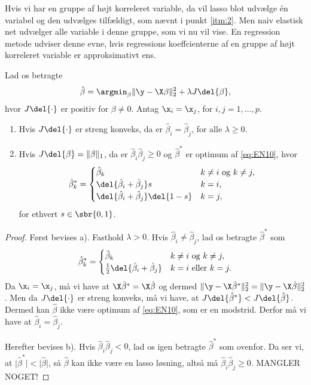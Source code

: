 %
Hvis vi har en gruppe af højt korreleret variable, da vil lasso blot udvælge én variabel og den udvælges tilfældigt, som nævnt i punkt \ref{itm:2}.
Men naiv elastisk net udvælger alle variable i denne gruppe, som vi nu vil vise. 
En regression metode udviser denne evne, hvis regressions koeffcienterne af en gruppe af højt korreleret variable er approksimativt ens.
%
\begin{lem} \label{lem:elastisk_net2}
Lad os betragte
\begin{align}
\hat{\beta} = \argmin_\beta \Vert \y - \X \beta \Vert_2^2 + \lambda J \del{\beta}, \label{eq:EN10}
\end{align}
hvor \(J \del{\cdot}\) er positiv for \(\beta \neq 0\).
Antag \(\x_i = \x_j\), for \(i, j = 1, \ldots, p\).
\begin{enumerate}[label=\alph*)]
\item Hvis \(J \del{\cdot}\) er streng konveks, da er \(\hat{\beta}_i = \hat{\beta}_j\), for alle \(\lambda \geq 0\).
\item Hvis \(J \del{\beta} = \Vert \beta \Vert_1\), da er \(\hat{\beta}_i \hat{\beta}_j \geq 0\) og \(\hat{\beta}^*\) er optimum af \eqref{eq:EN10}, hvor
\begin{align*}
\hat{\beta}_k^* = \begin{cases}
\hat{\beta}_k & k \neq i \text{ og } k \neq j, \\
\del{\hat{\beta}_i + \hat{\beta}_j} s & k = i, \\
\del{\hat{\beta}_i + \hat{\beta}_j} \del{1-s} & k = j,
\end{cases}
\end{align*}
for ethvert \(s \in \sbr{0,1}\).
\end{enumerate}
\end{lem}
%
\begin{proof}
Først bevises a).
Fasthold \(\lambda > 0\).
Hvis \(\hat{\beta}_i \neq \hat{\beta}_j\), lad os betragte \(\hat{\beta}^*\) som
\begin{align*}
\hat{\beta}_k^* = \begin{cases}
\hat{\beta}_k & k \neq i \text{ og } k \neq j, \\
\frac{1}{2} \del{\hat{\beta}_i + \hat{\beta}_j} & k = i \text{ eller } k = j.
\end{cases}
\end{align*}
Da \(\x_i = \x_j\), må vi have at \(\X \hat{\beta}^* = \X \hat{\beta}\) og dermed \(\Vert \y - \X \hat{\beta}^* \Vert_2^2 = \Vert \y - \X \hat{\beta} \Vert_2^2\).
Men da \(J \del{\cdot}\) er streng konveks, må vi have, at \(J \del{\hat{\beta}^*} < J \del{\hat{\beta}}\).
Dermed kan \(\hat{\beta}\) ikke være optimum af \eqref{eq:EN10}, som er en modstrid.
Derfor må vi have at \(\hat{\beta}_i = \hat{\beta}_j\).

Herefter bevises b).
Hvis \(\hat{\beta}_i \hat{\beta}_j < 0\), lad os igen betragte \(\hat{\beta}^*\) som ovenfor.
Da ser vi, at \(\vert \hat{\beta}^* \vert < \vert \hat{\beta} \vert\), så \(\hat{\beta}\) kan ikke være en lasso løsning, altså må \(\hat{\beta}_i \hat{\beta}_j \geq 0\).
MANGLER NOGET!
\end{proof}
